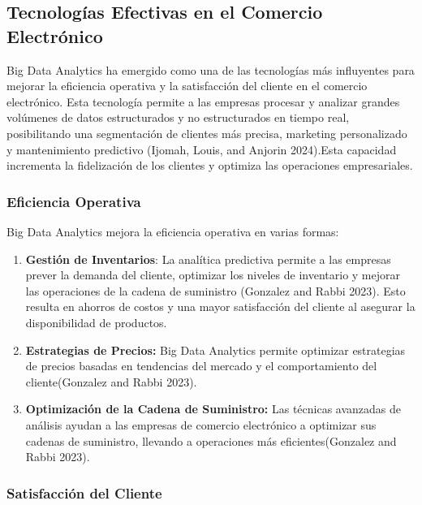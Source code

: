 \documentclass{article}
\providecommand{\tightlist}{%
  \setlength{\itemsep}{0pt}\setlength{\parskip}{0pt}}
\begin{document}
\subsection{Tecnologías Efectivas en el Comercio
Electrónico}\label{tecnologuxedas-efectivas-en-el-comercio-electruxf3nico}

Big Data Analytics ha emergido como una de las tecnologías más
influyentes para mejorar la eficiencia operativa y la satisfacción del
cliente en el comercio electrónico. Esta tecnología permite a las
empresas procesar y analizar grandes volúmenes de datos estructurados y
no estructurados en tiempo real, posibilitando una segmentación de
clientes más precisa, marketing personalizado y mantenimiento predictivo
(Ijomah, Louis, and Anjorin 2024).Esta capacidad incrementa la
fidelización de los clientes y optimiza las operaciones empresariales.

\subsubsection{Eficiencia Operativa}\label{eficiencia-operativa}

Big Data Analytics mejora la eficiencia operativa en varias formas:

\begin{enumerate}
\def\labelenumi{\arabic{enumi}.}
\tightlist
\item
  \textbf{Gestión de Inventarios}: La analítica predictiva permite a las
  empresas prever la demanda del cliente, optimizar los niveles de
  inventario y mejorar las operaciones de la cadena de suministro
  (Gonzalez and Rabbi 2023). Esto resulta en ahorros de costos y una
  mayor satisfacción del cliente al asegurar la disponibilidad de
  productos.
\item
  \textbf{Estrategias de Precios:} Big Data Analytics permite optimizar
  estrategias de precios basadas en tendencias del mercado y el
  comportamiento del cliente(Gonzalez and Rabbi 2023).
\item
  \textbf{Optimización de la Cadena de Suministro:} Las técnicas
  avanzadas de análisis ayudan a las empresas de comercio electrónico a
  optimizar sus cadenas de suministro, llevando a operaciones más
  eficientes(Gonzalez and Rabbi 2023).
\end{enumerate}

\subsubsection{Satisfacción del
Cliente}\label{satisfacciuxf3n-del-cliente}
\end{document}

